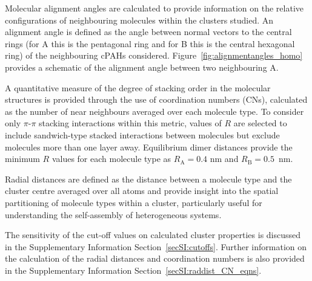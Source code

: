 
Molecular alignment angles are calculated to provide information on the relative configurations of neighbouring molecules within the clusters studied. An alignment angle is defined as the angle between normal vectors to the central rings (for A this is the pentagonal ring and for B this is the central hexagonal ring) of the neighbouring cPAHs considered.  Figure~\ref{fig:alignmentangles_homo} provides a schematic of the alignment angle between two neighbouring A.

A quantitative measure of the degree of stacking order in the molecular structures is provided through the use of coordination numbers (CNs), calculated as the number of near neighbours averaged over each molecule type. To consider only $\pi$-$\pi$ stacking interactions within this metric, values of $R$ are selected to include sandwich-type stacked interactions between molecules but exclude molecules more than one layer away. Equilibrium dimer distances provide the minimum $R$ values for each molecule type as $R_{\text{A}} = 0.4$ nm and $R_{\text{B}} = 0.5$~nm.

Radial distances are defined as the distance between a molecule type and the cluster centre averaged over all atoms and provide insight into the spatial partitioning of molecule types within a cluster, particularly useful for understanding the self-assembly of heterogeneous systems.

The sensitivity of the cut-off values on calculated cluster properties is discussed in the Supplementary Information Section~\ref{secSI:cutoffs}. Further information on the calculation of the radial distances and coordination numbers is also provided in the Supplementary Information Section~\ref{secSI:raddist_CN_eqns}.


